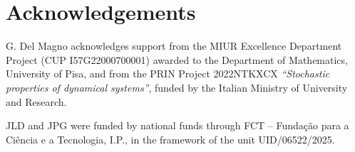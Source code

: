 \documentclass[a4paper,12pt,reqno]{amsart}
\numberwithin{equation}{section}
\begin{document}

%


%


%


%

\section*{Acknowledgements}

G. Del Magno acknowledges support from the MIUR Excellence Department Project (CUP I57G22000700001) awarded to the Department of Mathematics, University of Pisa, and from the PRIN Project 2022NTKXCX \textit{``Stochastic properties of dynamical systems''}, funded by the Italian Ministry of University and Research.

JLD and JPG were funded by national funds through FCT – Fundação para a Ciência e a Tecnologia, I.P., in the framework of the unit UID/06522/2025.



\end{document}
